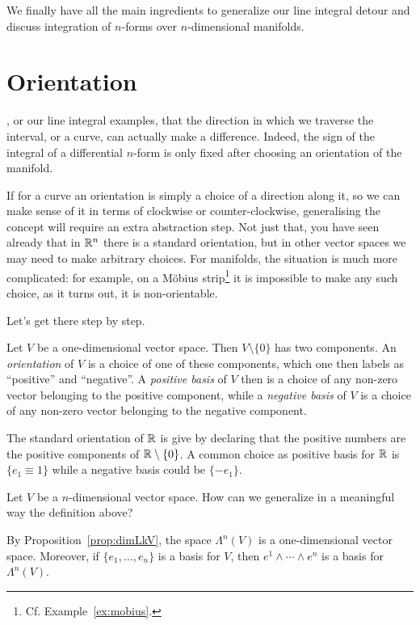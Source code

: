 We finally have all the main ingredients to generalize our line integral detour and discuss integration of $n$-forms over $n$-dimensional manifolds.

\section{Orientation}

, or our line integral examples, that the direction in which we traverse the interval, or a curve, can actually make a difference.
Indeed, the sign of the integral of a differential $n$-form is only fixed after choosing an orientation of the manifold.

If for a curve an orientation is simply a choice of a direction along it, so we can make sense of it in terms of clockwise or counter-clockwise, generalising the concept will require an extra abstraction step.
Not just that, you have seen already that in $\mathbb{R}^n$ there is a standard orientation, but in other vector spaces we may need to make arbitrary choices.
For manifolds, the situation is much more complicated: for example, on a M\"obius strip\footnote{Cf. Example~\ref{ex:mobius}.} it is impossible to make any such choice, as it turns out, it is non-orientable.

Let's get there step by step.

\begin{definition}
  Let $V$ be a one-dimensional vector space. Then $V\setminus\{0\}$ has two components.
  An \emph{orientation} of $V$ is a choice of one of these components, which one then labels as ``positive'' and ``negative''.
  A \emph{positive basis} of $V$ then is a choice of any non-zero vector belonging to the positive component, while a \emph{negative basis} of $V$ is a choice of any non-zero vector belonging to the negative component.
\end{definition}

\begin{example}
  The standard orientation of $\mathbb{R}$ is give by declaring that the positive numbers are the positive components of $\mathbb{R}\setminus\{0\}$.
  A common choice as positive basis for $\mathbb{R}$ is $\{e_1 \equiv 1\}$ while a negative basis could be $\{-e_1\}$.
\end{example}

Let $V$ be a $n$-dimensional vector space.
How can we generalize in a meaningful way the definition above?

By Proposition~\eqref{prop:dimLkV}, the space $\Lambda^n(V)$ is a one-dimensional vector space.
Moreover, if $\{e_1,\ldots,e_n\}$ is a basis for $V$, then $e^1\wedge\cdots\wedge e^n$ is a basis for $\Lambda^n(V)$.

